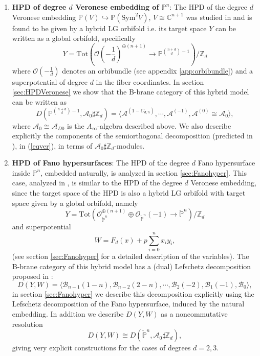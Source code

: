 \documentclass[a4paper,11pt]{article}
\def\cO{\mathcal{O}}
\def\cA{\mathcal{A}}
\newcommand{\bP}{{\mathbb{P}}}
\numberwithin{equation}{section}
\begin{document}
\begin{enumerate}
 \item \textbf{HPD of degree $d$ Veronese embedding of $\mathbb{P}^{n}$}: The 
HPD of the degree $d$ Veronese embedding 
$\mathbb{P}(V)\hookrightarrow\mathbb{P}(\mathrm{Sym}^{2}V)$, $V\cong 
\mathbb{C}^{n+1}$ was studied in \cite{Chen:2020iyo,ballard2014derived} and is 
found to be given by a hybrid LG orbifold i.e. its target space $Y$ can be 
written as a global orbifold, specifically
\[
Y=\mathrm{Tot}\left( \mathcal{O}\left( -\frac{1}{d} \right)^{\oplus(n+1)} 
\rightarrow \mathbb{P}^{{n+d \choose d}-1} \right)/\mathbb{Z}_d
\]
where $\mathcal{O}\left( -\frac{1}{d} \right)$ denotes an orbibundle (see 
appendix \ref{app:orbibundle}) and a superpotential of degree $d$ in the fiber 
coordinates. In section \ref{sec:HPDVeronese} we show that the B-brane 
category of this hybrid model can be written as
\begin{equation}\label{eqver}
D(\bP^{{n+d \choose d}-1},\cA_{0}\sharp \mathbb{Z}_d) = \langle 
\cA^{(1-C_{d,n})},\cdots,\cA^{(-1)},\cA^{(0)}\cong\mathcal{A}_{0} \rangle,
\end{equation}
where $\cA_{0}\cong \mathcal{A}_{D0}$ is the $A_{\infty}$-algebra described 
above. We also describe explicitly the components of the semiorthogonal 
decomposition (predicted in \cite{Chen:2020iyo}), in (\ref{eqver}), in terms of 
$\cA_{0}\sharp \mathbb{Z}_d$-modules.
 \item \textbf{HPD of Fano hypersurfaces}: The 
HPD of the degree $d$ Fano hypersurface inside $\mathbb{P}^{n}$, embedded 
naturally, is analyzed in section \ref{sec:Fanohyper}. This case, analyzed in 
\cite{Chen:2020iyo,ballard2014derived}, is similar to the HPD of the degree $d$ 
Veronese embedding, since the target space of the HPD is also a hybrid LG 
orbifold with target space given by a global orbifold, namely
\[
Y=\mathrm{Tot}\left( \cO_{\check{\mathbb{P}}^{n}}^{\oplus(n+1)}\oplus 
\cO_{\check{\mathbb{P}}^{n}}(-1) \rightarrow \check{\bP}^n \right)/\mathbb{Z}_d 
\]
and superpotential
\begin{equation}
W = F_{d}(x) + p \sum_{i=0}^n x_i y_i,
\end{equation}
(see section \ref{sec:Fanohyper} for a detailed description of the 
variables). The B-brane category of this hybrid model has a (dual) Lefschetz 
decomposition proposed in \cite{Chen:2020iyo}:
\begin{equation}
D(Y,W) = \langle \mathcal{B}_{n-1}(1-n), 
\mathcal{B}_{n-2}(2-n),\cdots, \mathcal{B}_2(-2), \mathcal{B}_1(-1), 
\mathcal{B}_0 \rangle,
\end{equation}
in section \ref{sec:Fanohyper} we describe this decomposition explicitly using 
the Lefschetz decomposition of the Fano hypersurface, induced by the natural 
embedding. In addition we describe $D(Y,W)$ as a noncommutative resolution
\begin{equation}
D(Y,W) \cong D(\check{\mathbb{P}}^{n},\cA_{0}\sharp \mathbb{Z}_d),
\end{equation}
giving very explicit constructions for the cases of degrees $d=2,3$.


\end{enumerate}
\end{document}
